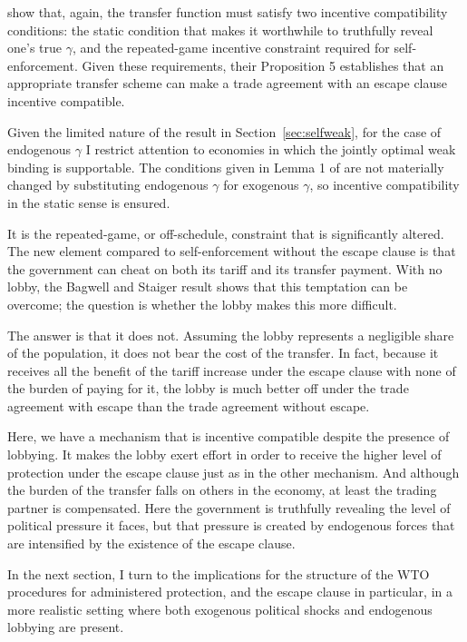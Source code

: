 \documentclass[12pt]{article}
\newcommand{\ga}{\gamma}
\begin{document}
\Textcite{bs2005} show that, again, the transfer function must satisfy two incentive compatibility conditions: the static condition that makes it worthwhile to truthfully reveal one's true $\ga$, and the repeated-game incentive constraint required for self-enforcement. Given these requirements, their Proposition 5 establishes that an appropriate transfer scheme can make a trade agreement with an escape clause incentive compatible.

Given the limited nature of the result in Section~\ref{sec:selfweak}, for the case of endogenous $\ga$ I restrict attention to economies in which the jointly optimal weak binding is supportable. The conditions given in Lemma 1 of \Textcite{bs2005} are not materially changed by substituting endogenous $\ga$ for exogenous $\ga$, so incentive compatibility in the static sense is ensured.

It is the repeated-game, or off-schedule, constraint that is significantly altered. The new element compared to self-enforcement without the escape clause is that the government can cheat on both its tariff and its transfer payment. With no lobby, the Bagwell and Staiger result shows that this temptation can be overcome; the question is whether the lobby makes this more difficult.

The answer is that it does not. Assuming the lobby represents a negligible share of the population, it does not bear the cost of the transfer. In fact, because it receives all the benefit of the tariff increase under the escape clause with none of the burden of paying for it, the lobby is much better off under the trade agreement with escape than the trade agreement without escape.


Here, we have a mechanism that is incentive compatible despite the presence of lobbying. It makes the lobby exert effort in order to receive the higher level of protection under the escape clause just as in the other mechanism. And although the burden of the transfer falls on others in the economy, at least the trading partner is compensated. Here the government is truthfully revealing the level of political pressure it faces, but that pressure is created by endogenous forces that are intensified by the existence of the escape clause.

In the next section, I turn to the implications for the structure of the WTO procedures for administered protection, and the escape clause in particular, in a more realistic setting where both exogenous political shocks and endogenous lobbying are present.
\end{document}
